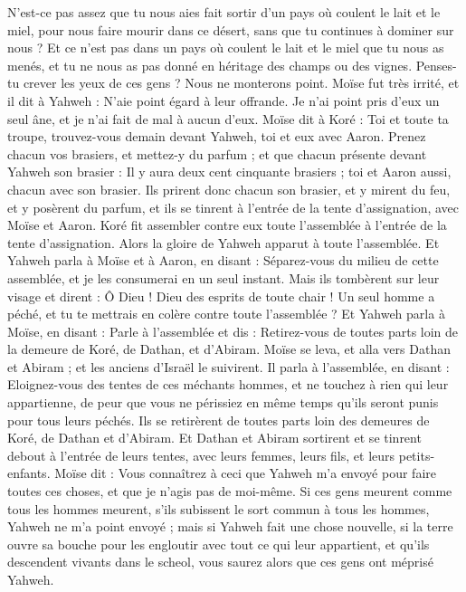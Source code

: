 \begin{multicols}{2}
N'est-ce pas assez que tu nous aies fait sortir d'un pays où coulent le lait et le miel, pour nous faire mourir dans ce désert, sans que tu continues à dominer sur nous ?
Et ce n'est pas dans un pays où coulent le lait et le miel que tu nous as menés, et tu ne nous as pas donné en héritage des champs ou des vignes. Penses-tu crever les yeux de ces gens ? Nous ne monterons point.
Moïse fut très irrité, et il dit à Yahweh : N'aie point égard à leur offrande. Je n'ai point pris d'eux un seul âne, et je n'ai fait de mal à aucun d'eux.
Moïse dit à Koré : Toi et toute ta troupe, trouvez-vous demain devant Yahweh, toi et eux avec Aaron.
Prenez chacun vos brasiers, et mettez-y du parfum ; et que chacun présente devant Yahweh son brasier : Il y aura deux cent cinquante brasiers ; toi et Aaron aussi, chacun avec son brasier.
Ils prirent donc chacun son brasier, et y mirent du feu, et y posèrent du parfum, et ils se tinrent à l'entrée de la tente d'assignation, avec Moïse et Aaron.
Koré fit assembler contre eux toute l'assemblée à l'entrée de la tente d'assignation. Alors la gloire de Yahweh apparut à toute l'assemblée.
Et Yahweh parla à Moïse et à Aaron, en disant :
Séparez-vous du milieu de cette assemblée, et je les consumerai en un seul instant.
Mais ils tombèrent sur leur visage et dirent : Ô Dieu ! Dieu des esprits de toute chair ! Un seul homme a péché, et tu te mettrais en colère contre toute l'assemblée ?
Et Yahweh parla à Moïse, en disant :
Parle à l'assemblée et dis : Retirez-vous de toutes parts loin de la demeure de Koré, de Dathan, et d'Abiram.
Moïse se leva, et alla vers Dathan et Abiram ; et les anciens d'Israël le suivirent.
Il parla à l'assemblée, en disant : Eloignez-vous des tentes de ces méchants hommes, et ne touchez à rien qui leur appartienne, de peur que vous ne périssiez en même temps qu'ils seront punis pour tous leurs péchés.
Ils se retirèrent de toutes parts loin des demeures de Koré, de Dathan et d'Abiram. Et Dathan et Abiram sortirent et se tinrent debout à l'entrée de leurs tentes, avec leurs femmes, leurs fils, et leurs petits-enfants.
Moïse dit : Vous connaîtrez à ceci que Yahweh m'a envoyé pour faire toutes ces choses, et que je n'agis pas de moi-même.
Si ces gens meurent comme tous les hommes meurent, s'ils subissent le sort commun à tous les hommes, Yahweh ne m'a point envoyé ;
mais si Yahweh fait une chose nouvelle, si la terre ouvre sa bouche pour les engloutir avec tout ce qui leur appartient, et qu'ils descendent vivants dans le scheol, vous saurez alors que ces gens ont méprisé Yahweh.

\end{multicols}

